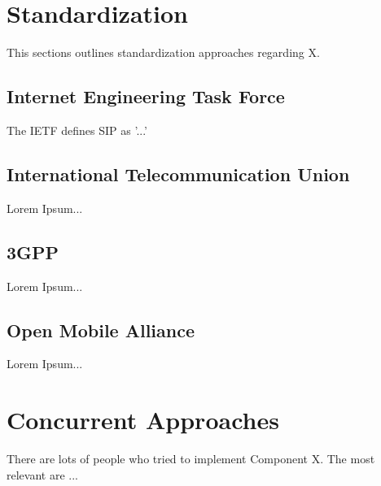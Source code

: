 \section{Standardization \label{sec:standard}}

This sections outlines standardization approaches regarding X.

\subsection{Internet Engineering Task Force\label{sec:ietf}}

The IETF defines SIP as '...' \cite{rfcsip}

\subsection{International Telecommunication Union\label{sec:itu}}

Lorem Ipsum...

\subsection{3GPP\label{sec:3gpp}}

Lorem Ipsum...

\subsection{Open Mobile Alliance\label{sec:oma}}

Lorem Ipsum...

\section{Concurrent Approaches \label{sec:summ}}

There are lots of people who tried to implement Component X. The most relevant are ...